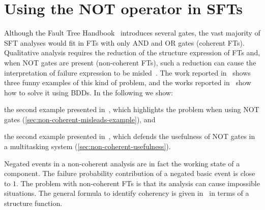 \documentclass[12pt,openright,twoside,a4paper,oldfontcommands,english,brazil,final]{abntex2}
\theoremstyle{theo}
\def\FThandbook{Fault Tree Handbook~\cite{VGR+1981}\index{Fault Tree!Handbook}%
  \gdef\FThandbook{Fault Tree Handbook\index{Fault Tree!Handbook}\xspace}%
  \xspace}
\begin{document}
\section[Using the NOT operator in static fault trees]{Using the \ac{NOT} operator in \aclp*{SFT}}
\label{sec:not-operator}

Although the \FThandbook introduces several gates, the vast majority of \ac{SFT} analyses would fit in \acp{FT} with only \ac{AND} and \ac{OR} gates (coherent \acp{FT}).
Qualitative analysis requires the reduction of the structure expression of \acp{FT} and, when \ac{NOT} gates are present (non-coherent \acp{FT}), such a reduction can cause the interpretation of failure expression to be misled~\cite{Andrews2001,Oliv2006,AB2003,CCR2008,Vaurio2016}.
The work reported in~\cite{Oliv2006} shows three funny examples of this kind of problem, and the works reported in~\cite{Andrews2001,Oliv2006,CCR2008} show how to solve it using \acp{BDD}.
In the following we show:
\begin{alineasinline}
  \item the second example presented in~\cite{Oliv2006}, which highlights the problem when using \ac{NOT} gates (\cref{sec:non-coherent-misleads-example}), and
  \item the second example presented in~\cite{Andrews2001}, which defends the usefulness of \ac{NOT} gates in a multitasking system (\cref{sec:non-coherent-usefulness}).
\end{alineasinline}

Negated events in a non-coherent analysis are in fact the working state of a component.
The failure probability contribution of a negated basic event is close to $1$.
The problem with non-coherent \acp{FT} is that its analysis can cause impossible situations.
The general formula to identify coherency is given in~\cite{Andrews2001,CCR2008} in terms of a structure function.
\end{document}
